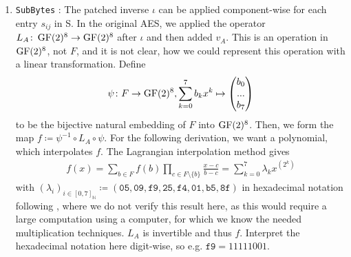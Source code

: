 \begin{enumerate}[label=(\roman*')]
    \item \texttt{SubBytes} \cite[pp. 5-8]{Murphy2002}: The patched inverse \(\iota\) can be applied component-wise for each entry \(s_{ij}\) in S. In the original AES, we applied the operator \(L_A\colon \operatorname{GF}(2)^8 \to \operatorname{GF}(2)^8\) after \(\iota\) and then added \(v_A\). This is an operation in \(\operatorname{GF}(2)^8\), not \(F\), and it is not clear, how we could represent this operation with a linear transformation. Define
    \begin{align}
        \psi\colon F \to \operatorname{GF}(2)^8, \sum_{k=0}^7 b_kx^k \mapsto \begin{pmatrix}
            b_0\\
            ...\\
            b_7
        \end{pmatrix}
    \end{align}
    to be the bijective natural embedding of \(F\) into \(\operatorname{GF}(2)^8\). Then, we form the map \(f \coloneqq \psi^{-1} \circ L_A \circ \psi\). For the following derivation, we want a polynomial, which interpolates \(f\). The Lagrangian interpolation method \cite[p. 193]{Fischer2017} gives
    \begin{align}
        f(x) = \sum_{b \in F} f(b) \prod_{c \in F \setminus \{b\}} \frac{x-c}{b-c} = \sum_{k=0}^7 \lambda_k x^{\left(2^k\right)}
    \end{align}
    with \((\lambda_i)_{i \in [0, 7]_{\mathbb{N}}} \coloneqq (\texttt{05}, \texttt{09}, \texttt{f9}, \texttt{25}, \texttt{f4}, \texttt{01}, \texttt{b5}, \texttt{8f})\) in hexadecimal notation following \cite[p. 7]{Murphy2002}, where we do not verify this result here, as this would require a large computation using a computer, for which we know the needed multiplication techniques. \(L_A\) is invertible and thus \(f\). Interpret the hexadecimal notation here digit-wise, so e.g. \(\texttt{f9} = 11111001\).


\end{enumerate}
